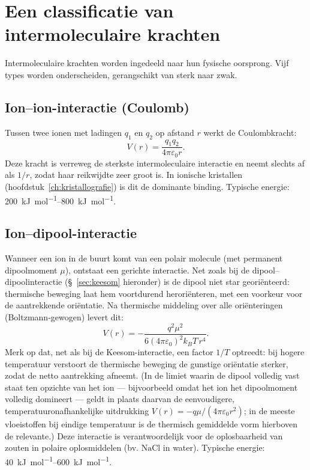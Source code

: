 \section{Een classificatie van intermoleculaire krachten}

Intermoleculaire krachten worden ingedeeld naar hun fysische oorsprong. Vijf types worden onderscheiden, gerangschikt van sterk naar zwak.

\subsection{Ion--ion-interactie (Coulomb)}

Tussen twee ionen met ladingen $q_1$ en $q_2$ op afstand $r$ werkt de Coulombkracht:
\begin{equation}
V(r) = \frac{q_1 q_2}{4\pi\varepsilon_0 r}.
\end{equation}
Deze kracht is verreweg de sterkste intermoleculaire interactie en neemt slechts af als $1/r$, zodat haar reikwijdte zeer groot is. In ionische kristallen (hoofdstuk~\ref{ch:kristallografie}) is dit de dominante binding. Typische energie: \SIrange{200}{800}{\kilo\joule\per\mole}.

\subsection{Ion--dipool-interactie}
\label{sec:ion-dipool}

Wanneer een ion in de buurt komt van een polair molecule (met permanent dipoolmoment $\mu$), ontstaat een gerichte interactie. Net zoals bij de dipool--dipoolinteractie (\S~\ref{sec:keesom} hieronder) is de dipool niet star georiënteerd: thermische beweging laat hem voortdurend heroriënteren, met een voorkeur voor de aantrekkende oriëntatie. Na thermische middeling over alle oriënteringen (Boltzmann-gewogen) levert dit:
\begin{equation}
\boxed{\;V(r) = -\frac{q^2 \mu^2}{6(4\pi\varepsilon_0)^2 k_BT\, r^4}.\;}
\end{equation}
Merk op dat, net als bij de Keesom-interactie, een factor $1/T$ optreedt: bij hogere temperatuur verstoort de thermische beweging de gunstige oriëntatie sterker, zodat de netto aantrekking afneemt. (In de limiet waarin de dipool volledig vast staat ten opzichte van het ion --- bijvoorbeeld omdat het ion het dipoolmoment volledig domineert --- geldt in plaats daarvan de eenvoudigere, temperatuuronafhankelijke uitdrukking $V(r)=-q\mu/(4\pi\varepsilon_0 r^2)$; in de meeste vloeistoffen bij eindige temperatuur is de thermisch gemiddelde vorm hierboven de relevante.) Deze interactie is verantwoordelijk voor de oplosbaarheid van zouten in polaire oplosmiddelen (bv. $\mathrm{NaCl}$ in water). Typische energie: \SIrange{40}{600}{\kilo\joule\per\mole}.


